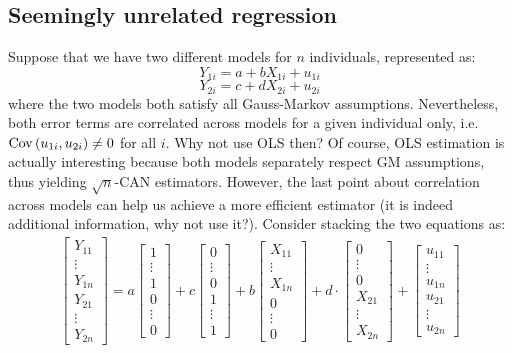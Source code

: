 \subsection{Seemingly unrelated regression}

Suppose that we have two different models for $n$ individuals, represented as: $$Y_{1i} = a + b X_{1i} + u_{1i}$$
$$Y_{2i} = c + d X_{2i} + u_{2i}$$ where the two models both satisfy all Gauss-Markov assumptions. Nevertheless, both error terms are correlated across models for a given individual only, i.e. $\operatorname{Cov}\left(u_{1i},u_{2i}\right)\neq 0$ for all $i$. Why not use OLS then? Of course, OLS estimation is actually interesting because both models separately respect GM assumptions, thus yielding $\sqrt{n}$-CAN estimators. However, the last point about correlation across models can help us achieve a more efficient estimator (it is indeed additional information, why not use it?). Consider stacking the two equations as:\begin{align*}
\begin{bmatrix}
Y_{11} \\
\vdots \\
Y_{1n} \\
Y_{21} \\
\vdots \\
Y_{2n}
\end{bmatrix} = a  \begin{bmatrix}
1 \\
\vdots \\
1\\
0 \\
\vdots \\
0
\end{bmatrix} + c  \begin{bmatrix}
0 \\
\vdots \\
0\\
1 \\
\vdots \\
1
\end{bmatrix}
+ b \begin{bmatrix}
X_{11} \\
\vdots \\
X_{1n}\\
0 \\
\vdots \\
0
\end{bmatrix} + d \cdot \begin{bmatrix}
0 \\
\vdots \\
0\\
X_{21} \\
\vdots \\
X_{2n}
\end{bmatrix} +
\begin{bmatrix}
u_{11} \\
\vdots \\
u_{1n} \\
u_{21} \\
\vdots \\
u_{2n}
\end{bmatrix}
\end{align*}
